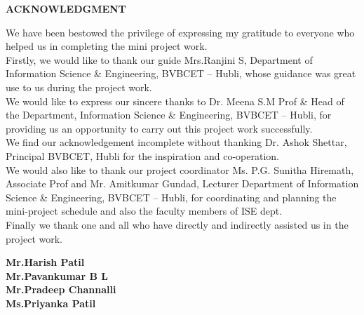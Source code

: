 %



\maketitle
\thispagestyle{empty}
\pagestyle{empty}
\normalsize
\newpage
\begin{center}
\huge \textbf{ACKNOWLEDGMENT}
\end{center}

\vspace{0.5cm}
We have been bestowed the privilege of expressing my gratitude to everyone who helped us in completing the mini project work.\\

Firstly, we would like to thank our guide Mrs.Ranjini S, Department of Information Science \& Engineering, BVBCET – Hubli, whose guidance was great use to us during the project work.\\

We would like to express our sincere thanks to Dr. Meena S.M Prof \& Head of the Department, Information Science \& Engineering, BVBCET – Hubli, for providing us an opportunity to carry out this project work successfully.\\

We find our acknowledgement incomplete without thanking Dr. Ashok Shettar, Principal BVBCET, Hubli for the inspiration and co-operation.\\

We would also  like to thank our project coordinator Ms. P.G. Sunitha Hiremath, Associate Prof and Mr. Amitkumar Gundad, Lecturer Department of Information Science \& Engineering, BVBCET – Hubli, for coordinating and planning the mini-project schedule and also the faculty members of ISE dept.\\

Finally we thank one and all who have directly and indirectly assisted us in the project work.

											
\begin{flushright}
\textbf{Mr.Harish Patil}\\
\textbf{Mr.Pavankumar B L}\\
\textbf{Mr.Pradeep Channalli}\\
\textbf{Ms.Priyanka Patil}
\end{flushright}

\maketitle
\thispagestyle{empty}
\pagestyle{empty}